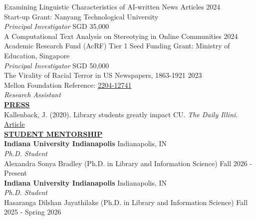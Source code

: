 \documentclass{article}
\begin{document}
\noindent Examining Linguistic Characteristics of AI-written News Articles \hfill 2024 \\
\null \hfill Start-up Grant: Nanyang Technological University \\
\textit{Principal Investigator} 
\null \hfill SGD 35,000 \\

\noindent A Computational Text Analysis on Stereotying in Online Communities \hfill 2024 \\
\null \hfill Academic Research Fund (AcRF) Tier 1 Seed Funding Grant: Ministry of Education, Singapore \\
\textit{Principal Investigator} 
\null \hfill SGD 50,000 \\

\noindent The Virality of Racial Terror in US Newspapers, 1863-1921 \hfill 2023 \\
\null \hfill Mellon Foundation Reference: \href{https://www.mellon.org/grant-details/the-virality-of-racial-terror-in-us-newspapers-1863-1921-20452145}{2204-12741}  \\
\textit{Research Assistant} \\


\noindent \textbf{\underline{PRESS}} \\
\noindent Kallenback, J. (2020). Library students greatly impact CU. \textit{The Daily Illini}. \hfill \href{https://dailyillini.com/life_and_culture-stories/2020/11/11/library-students-greatly-impact-cu/}{Article} \\


\noindent \textbf{\underline{STUDENT MENTORSHIP}} \\
\noindent \textbf{Indiana University Indianapolis} \hfill Indianapolis, IN \\
\noindent \textit{Ph.D. Student} \\
\noindent Alexandra Sonya Bradley (Ph.D. in Library and Information Science) \hfill Fall 2026 - Present \\

\noindent \textbf{Indiana University Indianapolis} \hfill Indianapolis, IN \\
\noindent \textit{Ph.D. Student} \\
\noindent Hasaranga Dilshan Jayathilake (Ph.D. in Library and Information Science) \hfill Fall 2025 - Spring 2026 \\
\end{document}
